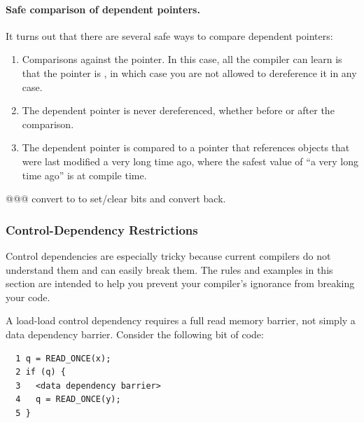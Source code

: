 
\paragraph{Safe comparison of dependent pointers.}
It turns out that there are several safe ways to compare dependent
pointers:

\begin{enumerate}
\item	Comparisons against the  pointer.
	In this case, all the compiler can learn is that the pointer
	is , in which case you are not allowed to
	dereference it in any case.
\item	The dependent pointer is never dereferenced, whether before or
	after the comparison.
\item	The dependent pointer is compared to a pointer that references
	objects that were last modified a very long time ago, where
	the safest value of ``a very long time ago'' is at compile time.
\end{enumerate}

@@@ convert to  to set/clear bits and convert back.


\subsubsection{Control-Dependency Restrictions}
\label{sec:advsync:Control-Dependency Restrictions}

Control dependencies are especially tricky because current compilers
do not understand them and can easily break them.
The rules and examples in this section are intended to help you
prevent your compiler's ignorance from breaking your code.

A load-load control dependency requires a full read memory barrier,
not simply a data dependency barrier.
Consider the following bit of code:

\vspace{5pt}
\begin{minipage}[t]{\columnwidth}
\scriptsize
\begin{verbatim}
  1 q = READ_ONCE(x);
  2 if (q) {
  3   <data dependency barrier>
  4   q = READ_ONCE(y);
  5 }
\end{verbatim}
\end{minipage}
\vspace{5pt}

